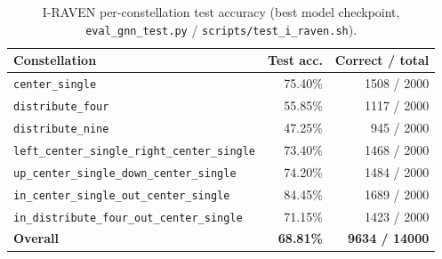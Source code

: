 \begin{table}[h]
\centering
\begin{tabular}{|l|r|r|}
\hline
Constellation & Test acc. & Correct / total \\
\hline
\texttt{center\_single} & 75.40\% & 1508 / 2000 \\
\hline
\texttt{distribute\_four} & 55.85\% & 1117 / 2000 \\
\hline
\texttt{distribute\_nine} & 47.25\% & 945 / 2000 \\
\hline
\texttt{left\_center\_single\_right\_center\_single} & 73.40\% & 1468 / 2000 \\
\hline
\texttt{up\_center\_single\_down\_center\_single} & 74.20\% & 1484 / 2000 \\
\hline
\texttt{in\_center\_single\_out\_center\_single} & 84.45\% & 1689 / 2000 \\
\hline
\texttt{in\_distribute\_four\_out\_center\_single} & 71.15\% & 1423 / 2000 \\
\hline
\textbf{Overall} & \textbf{68.81\%} & \textbf{9634 / 14000} \\
\hline
\end{tabular}
\caption{I-RAVEN per-constellation test accuracy (best model checkpoint, \texttt{eval\_gnn\_test.py} / \texttt{scripts/test\_i\_raven.sh}).}
\end{table}
